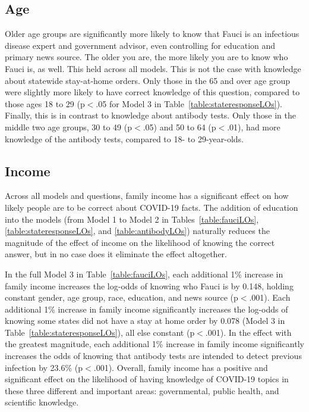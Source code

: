 \documentclass[11pt]{article}
\begin{document}
\subsection{Age}

Older age groups are significantly more likely to know that Fauci is an infectious disease expert and government advisor, even controlling for education and primary news source. The older you are, the more likely you are to know who  Fauci is, as well. %
This held across all models.
This is not the case with knowledge about statewide stay-at-home orders. Only those in the 65 and over age group were slightly more likely to have correct knowledge of this question, compared to those ages 18 to 29 (p$<$.05 for Model 3 in Table~\ref{table:stateresponseLOs}). Finally, this is in contrast to knowledge about antibody tests. Only those in the middle two age groups, 30 to 49 (p$<$.05) and 50 to 64 (p$<$.01), had more knowledge of the antibody tests, compared to 18- to 29-year-olds.


\subsection{Income}\label{sec:income}

Across all models and questions, family income has a significant effect on how likely people are to be correct about COVID-19 facts. The addition of education into the models (from Model 1 to Model 2 in Tables~\ref{table:fauciLOs}, \ref{table:stateresponseLOs}, and \ref{table:antibodyLOs}) naturally reduces the magnitude of the effect of income on the likelihood of knowing the correct answer, but in no case does it eliminate the effect altogether.

In the full Model 3 in Table~\ref{table:fauciLOs}, each additional 1\% increase in family income increases the log-odds of knowing who Fauci is by 0.148, holding constant gender, age group, race, education, and news source (p$<$.001).
Each additional 1\% increase in family income significantly increases the log-odds of knowing some states did not have a stay at home order by 0.078 (Model 3 in Table~\ref{table:stateresponseLOs}), all else constant (p$<$.001).
In the effect with the greatest magnitude, each additional 1\% increase in family income significantly increases the odds of knowing that antibody tests are intended to detect previous infection by 23.6\% (p$<$.001). %
Overall, family income has a positive and significant effect on the likelihood of having knowledge of COVID-19 topics in these three different and important areas: governmental, public health, and scientific knowledge.
\end{document}
